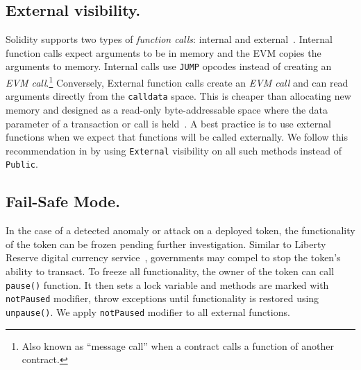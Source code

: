 %

\subsection{External visibility.}\label{subsec:external}

Solidity supports two types of \textit{function calls}: internal and external~\cite{SolidityDoc}. Internal function calls expect arguments to be in memory and the EVM copies the arguments to memory. Internal calls use \texttt{JUMP} opcodes instead of creating an \textit{EVM call}.\footnote{Also known as ``message call'' when a contract calls a function of another contract.} Conversely, External function calls create an \textit{EVM call} and can read arguments directly from the \texttt{calldata} space. This is cheaper than allocating new memory and designed as a read-only byte-addressable space where the data parameter of a transaction or call is held~\cite{EthInDepth}. A best practice is to use external functions when we expect that functions will be called externally. We follow this recommendation in \sys by using \texttt{External} visibility on all such methods instead of \texttt{Public}. 

\subsection{Fail-Safe Mode.}

In the case of a detected anomaly or attack on a deployed \erc token, the functionality of the token can be frozen pending further investigation. { \blue Similar to Liberty Reserve digital currency service~\cite{LibertyReserve}, governments may compel to stop the token's ability to transact. } To freeze all functionality, the owner of the token can call \texttt{pause()} function. It then sets a lock variable and methods are marked with \texttt{notPaused} modifier, throw exceptions until functionality is restored using \texttt{unpause()}. We apply \texttt{notPaused} modifier to all external functions.

